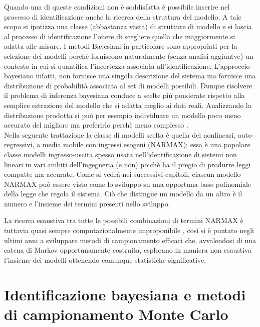 \documentclass[10pt,a4paper,oneside,openany,noindent]{book}
\begin{document}
Quando una di queste condizioni non è soddisfatta è possibile inserire nel processo di identificazione anche la ricerca della struttura del modello.
A tale scopo si ipotizza una classe (abbastanza vasta) di strutture di modello
e si lascia al processo di identificazione l’onere di scegliere quella che maggiormente si adatta
alle misure. I metodi Bayesiani in particolare sono appropriati per la selezione dei
modelli perchè forniscono naturalmente (senza analisi aggiuntve) un contesto in cui
si quantifica l’incertezza associata all’identificazione. L’approccio bayesiano infatti, non fornisce una singola descrizione del sistema ma fornisce una distribuzione di
probabilità associata al set di modelli possibili. Dunque risolvere il problema di
inferenza bayesiana conduce a scelte più  ponderate rispetto alla semplice estrazione
del modello che si adatta meglio ai dati reali. Analizzando la distribuzione prodotta
si può per esempio individuare un modello poco meno accurato del migliore ma
preferirlo perchè meno complesso .\\
Nella seguente trattazione la classe di modelli scelta è quella dei nonlineari, auto-regressivi, a media mobile
con ingressi esogeni (NARMAX); essa è una popolare classe modelli ingresso-uscita
spesso usata nell’identificazione di sistemi non lineari in vari ambiti dell’ingegneria
(e non) poichè ha il pregio di produrre leggi compatte ma accurate.
Come si vedrà nei successivi capitoli, ciascun modello NARMAX può essere visto
come lo sviluppo su una opportuna base polinomiale della legge che
regola il sistema. Ciò che distingue un modello da un altro è il numero e l’insieme
dei termini presenti nello sviluppo.

La ricerca esaustiva tra tutte le possibili combinazioni di termini NARMAX è tuttavia quasi sempre computazionalmente improponibile , così si è puntato negli ultimi
anni a sviluppare metodi di campionamento efficaci che, avvalendosi di una catena
di Markov opportunamente costruita, esplorano in maniera non esaustiva l’insieme
dei modelli ottenendo comunque statistiche significative.
\chapter{Identificazione bayesiana e metodi
di campionamento Monte Carlo}
\end{document}

